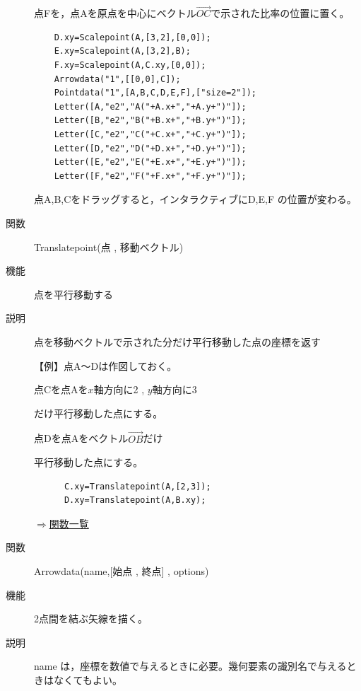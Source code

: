 \documentclass[papersize,a4paper,12pt,uplatex]{jsarticle}
\begin{document}
\begin{description}
点Fを，点Aを原点を中心にベクトル$\overrightarrow{OC} $で示された比率の位置に置く。
\begin{verbatim}
    D.xy=Scalepoint(A,[3,2],[0,0]);
    E.xy=Scalepoint(A,[3,2],B);
    F.xy=Scalepoint(A,C.xy,[0,0]);
    Arrowdata("1",[[0,0],C]);
    Pointdata("1",[A,B,C,D,E,F],["size=2"]);
    Letter([A,"e2","A("+A.x+","+A.y+")"]);
    Letter([B,"e2","B("+B.x+","+B.y+")"]);
    Letter([C,"e2","C("+C.x+","+C.y+")"]);
    Letter([D,"e2","D("+D.x+","+D.y+")"]);
    Letter([E,"e2","E("+E.x+","+E.y+")"]);
    Letter([F,"e2","F("+F.x+","+F.y+")"]);
\end{verbatim}
\vspace{\baselineskip}
\begin{center}  \end{center}

点A,B,Cをドラッグすると，インタラクティブにD,E,F の位置が変わる。

\vspace{\baselineskip}
\hypertarget{translatepoint}{}
\item[関数]  Translatepoint(点 , 移動ベクトル)
\item[機能]  点を平行移動する
\item[説明]  点を移動ベクトルで示された分だけ平行移動した点の座標を返す

\vspace{\baselineskip}
【例】点A〜Dは作図しておく。

点Cを点Aを$x$軸方向に2 , $y$軸方向に3

だけ平行移動した点にする。

点Dを点Aをベクトル$\overrightarrow{OB} $だけ

平行移動した点にする。
\begin{verbatim}
      C.xy=Translatepoint(A,[2,3]);
      D.xy=Translatepoint(A,B.xy);
\end{verbatim}

\hspace{20mm} 

\begin{flushright}  \hyperlink{functionlist}{$\Rightarrow$関数一覧}\end{flushright}

\hypertarget{arrowdata}{}
\item[関数]  Arrowdata(name,[始点 , 終点] , options) 
\item[機能]  2点間を結ぶ矢線を描く。
\item[説明]  name は，座標を数値で与えるときに必要。幾何要素の識別名で与えるときはなくてもよい。


\end{description}
\end{document}
